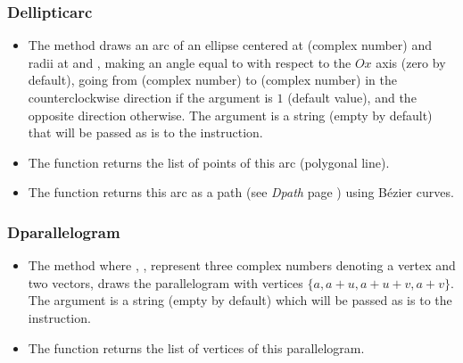 \subsubsection{Dellipticarc}
\begin{itemize}
    \item The method  draws an arc of an ellipse centered at  (complex number) and radii at  and , making an angle equal to  with respect to the \(Ox\) axis (zero by default), going from  (complex number) to  (complex number) in the counterclockwise direction if the argument  is $1$ (default value), and the opposite direction otherwise. The  argument is a string (empty by default) that will be passed as is to the \drawcmd instruction.
    \item The  function returns the list of points of this arc (polygonal line).
    \item The  function returns this arc as a path (see \emph{Dpath} page \pageref{Dpath}) using Bézier curves.
\end{itemize}

\subsubsection{Dparallelogram}
\begin{itemize}
    \item The method  where , ,  represent three complex numbers denoting a vertex and two vectors, draws the parallelogram with vertices $\{a,a+u,a+u+v,a+v\}$. The argument  is a string (empty by default) which will be passed as is to the \drawcmd instruction.
    \item The function  returns the list of vertices of this parallelogram.
\end{itemize}

